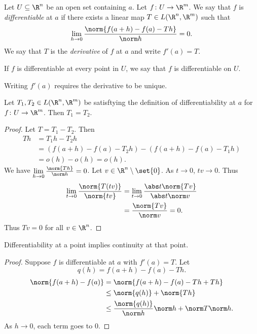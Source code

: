
\begin{definition*}
    Let $U \subseteq \R^n$ be an open set containing $a$.
    Let $f\colon U \to \R^m$.
    We say that $f$ is \emph{differentiable} at $a$ if there exists a
    linear map $T \in L(\R^n, \R^m)$ such that \[
        \lim_{h \to 0} \frac{\norm{f(a + h) - f(a) - Th}}{\norm h} = 0.
    \]
    We say that $T$ is the \emph{derivative} of $f$ at $a$ and write
    $f'(a) = T$.

    If $f$ is differentiable at every point in $U$, we say that $f$ is
    differentiable on $U$.
\end{definition*}
Writing $f'(a)$ requires the derivative to be unique.
\begin{proposition}
    Let $T_1, T_2 \in L(\R^n, \R^m)$ be satisftying the definition of
    differentiability at $a$ for $f\colon U \to \R^m$.
    Then $T_1 = T_2$.
\end{proposition}
\begin{proof}
    Let $T = T_1 - T_2$.
    Then \begin{align*}
        Th &= T_1h - T_2h \\
            &= (f(a + h) - f(a) - T_2h) - (f(a + h) - f(a) - T_1h) \\
            &= o(h) - o(h) = o(h).
    \end{align*}
    We have $\lim\limits_{h \to 0} \frac{\norm{Th}}{\norm h} = 0$.
    Let $v \in \R^n \setminus \set{0}$.
    As $t \to 0$, $tv \to 0$.
    Thus \begin{align*}
        \lim_{t \to 0} \frac{\norm{T(tv)}}{\norm{tv}}
            &= \lim_{t \to 0} \frac{\abs t \norm{Tv}}{\abs t \norm v} \\
            &= \frac{\norm{Tv}}{\norm v} = 0.
    \end{align*}
    Thus $Tv = 0$ for all $v \in \R^n$.
\end{proof}

\begin{proposition}
    Differentiability at a point implies continuity at that point.
\end{proposition}
\begin{proof}
    Suppose $f$ is differentiable at $a$ with $f'(a) = T$.
    Let \[
        q(h) = f(a + h) - f(a) - Th.
    \]
    \begin{align*}
        \norm{f(a + h) - f(a)}
            &= \norm{f(a+h) - f(a) - Th + Th} \\
            &\le \norm{q(h)} + \norm{Th} \\
            &\le \frac{\norm{q(h)}}{\norm h} \norm h + \norm T \norm h.
    \end{align*}
    As $h \to 0$, each term goes to $0$.
\end{proof}

